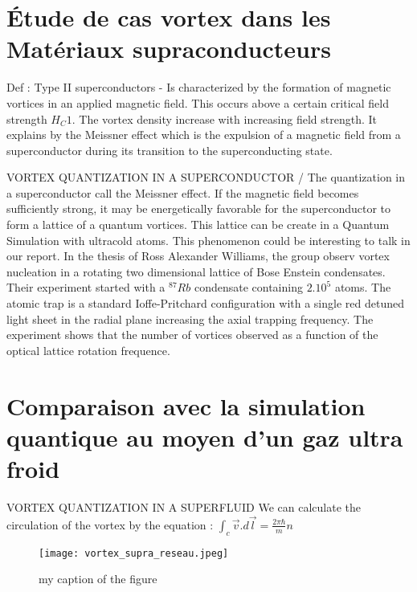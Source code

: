 \documentclass[a4paper]{article}
\begin{document}
\begin{multicols}{2}
\section{Étude de cas vortex dans les Matériaux supraconducteurs}

Def : Type II superconductors -
Is characterized by the formation of magnetic vortices in an applied magnetic field. This occurs above a certain critical field strength $H_C1$. The vortex density increase with increasing field strength. It explains by the Meissner effect which is the expulsion of a magnetic field from a superconductor during its transition to the superconducting state.

VORTEX QUANTIZATION IN A SUPERCONDUCTOR /
The quantization in a superconductor call the Meissner effect. If the magnetic field becomes sufficiently strong, it may be energetically favorable for the superconductor to form a lattice of a quantum vortices. This lattice can be create in a Quantum Simulation with ultracold atoms. This phenomenon could be interesting to talk in our report. 
In the thesis of Ross Alexander Williams, the group observ vortex nucleation in a rotating two dimensional lattice of Bose Enstein condensates. Their experiment started with a $^{87}Rb$ condensate containing $2.10^{5}$ atoms. The atomic trap is a standard Ioffe-Pritchard configuration with a single red detuned light sheet in the radial plane increasing the axial trapping frequency. 
The experiment shows that the number of vortices observed as a function of the optical lattice rotation frequence. 


\section{Comparaison avec la simulation quantique au moyen d'un gaz ultra froid}

VORTEX QUANTIZATION IN A SUPERFLUID
We can calculate the circulation of the vortex by the equation :
$\int_c \vec{v}.d\vec{l} = \frac{2\pi\hbar}{m}n$

\begin{figure}[H]
 \centering
 \texttt{[image: vortex\_supra\_reseau.jpeg]}
 \caption{\label{fig:vortex}my caption of the figure}
\end{figure}



\end{multicols}
\end{document}
